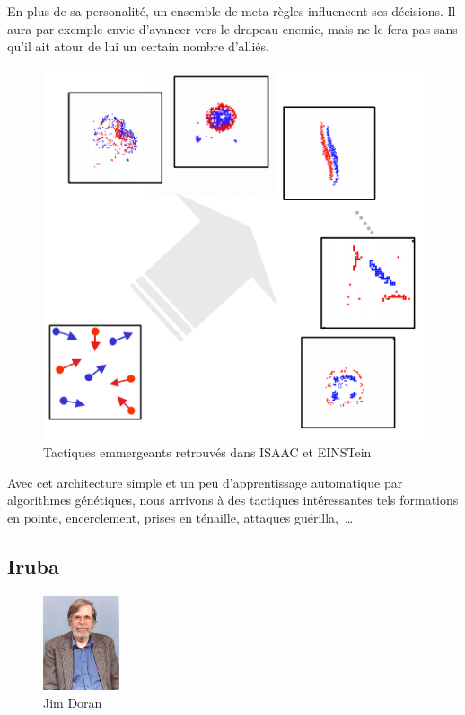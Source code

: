 \documentclass{article}
\begin{document}
En plus de sa personalité, un ensemble de \og{}meta-règles\fg{} influencent ses décisions. Il aura par exemple envie d'avancer vers le drapeau enemie, mais ne le fera pas sans qu'il ait atour de lui un certain nombre d'alliés.

\begin{figure}[H]
	\begin{center}
	\includegraphics[width=0.8\linewidth]{../ressources/einstein_global_behavior}
	\caption{Tactiques emmergeants retrouvés dans ISAAC et EINSTein}
	\end{center}
\end{figure}

Avec cet architecture simple et un peu d'apprentissage automatique par algorithmes génétiques, nous arrivons à des tactiques intéressantes tels formations en pointe, encerclement, prises en ténaille, attaques guérilla,~\dots

\subsection{Iruba}

\begin{figure}
  \begin{center}
	\includegraphics[width=0.2\textwidth]{../ressources/doran}
	\caption{Jim Doran}
  \end{center}
\end{figure}
\end{document}
